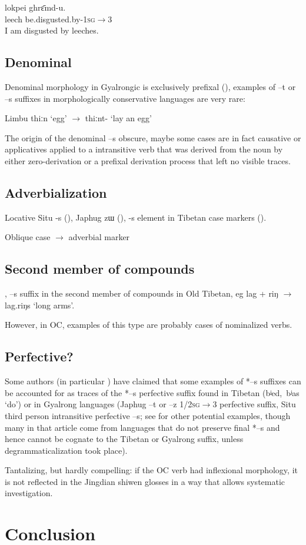 \documentclass[oldfontcommands,oneside,a4paper,11pt]{article}
\newcommand{\ipa}[1]{{\phon \mbox{#1}}} %
\begin{document}
\begin{exe}
\ex \label{ex:ghryamt} 
\gll 
  	\ipa{lokpei}  	\ipa{ghrɛ̄md-u.}  \\
leech  be.disgusted.by-\textsc{1sg$\rightarrow$3} \\
 \glt  I am disgusted by leeches.
\end{exe}

\subsection{Denominal}
Denominal morphology in Gyalrongic is exclusively prefixal (\citealt{jacques14antipassive}), examples of \ipa{--t} or \ipa{--s} suffixes in morphologically conservative languages are very rare:

Limbu \ipa{thiːn} `egg' $\rightarrow$ \ipa{thiːnt-} `lay an egg'

The origin of the denominal \ipa{--s} obscure, maybe some cases are in fact causative or applicatives applied to a intransitive verb that was derived from the noun by either zero-derivation or a prefixal derivation process that left no visible traces.

\subsection{Adverbialization}

 
Locative Situ \ipa{-s} (\citealt{linxr93jiarong}), Japhug \ipa{zɯ} (\citealt[167-9]{jacques08zh}), \ipa{-s} element in Tibetan case markers (\citealt{hill12bas}).

Oblique case $\rightarrow$ adverbial marker


\subsection{Second member of compounds}


\citet{uebach08rjeblas}, \ipa{--s} suffix in the second member of compounds in Old Tibetan, eg \ipa{lag} + \ipa{riŋ} $\rightarrow$ \ipa{lag.riŋs} `long arms'.

 However, in OC, examples of this type are probably cases of nominalized verbs.
 
\subsection{Perfective?}
Some authors (in particular \citealt{jinlx06}) have claimed that some examples of *\ipa{--s} suffixes can be accounted for as traces of the *\ipa{--s} perfective suffix found in Tibetan (\ipa{bʲed, bʲas} `do') or in Gyalrong languages (Japhug \ipa{--t} or \ipa{--z} \textsc{1/2sg}$\rightarrow$3 perfective suffix, Situ third person intransitive perfective \ipa{--s}; see \citealt{huangbf97s.houzhui} for other potential examples, though many in that article come from languages that do not preserve final *\ipa{--s} and hence cannot be cognate to the Tibetan or Gyalrong suffix, unless degrammaticalization took place).

Tantalizing, but hardly compelling: if the OC verb had inflexional morphology, it is not reflected in the Jingdian shiwen glosses in a way that allows systematic investigation.

\section{Conclusion}



\end{document}
